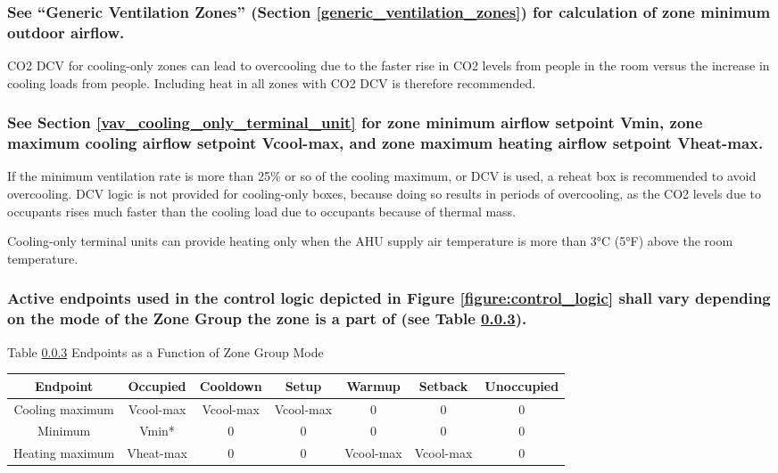 \documentclass[10pt]{article}
\begin{document}
\subsubsection{See “Generic Ventilation Zones” (Section \ref{generic_ventilation_zones}) for calculation of zone minimum outdoor airflow.}

CO2 DCV for cooling-only zones can lead to overcooling due to the faster rise in CO2 levels from people in the room versus the increase in cooling loads from people. Including heat in all zones with CO2 DCV is therefore recommended. 

\subsubsection{See Section \ref{vav_cooling_only_terminal_unit} for zone minimum airflow setpoint Vmin, zone maximum cooling airflow setpoint Vcool-max, and zone maximum heating airflow setpoint Vheat-max.}

If the minimum ventilation rate is more than 25\% or so of the cooling maximum, or DCV is used, a reheat box is recommended to avoid overcooling. DCV logic is not provided for cooling-only boxes, because doing so results in periods of overcooling, as the CO2 levels due to occupants rises much faster than the cooling load due to occupants because of thermal mass.

Cooling-only terminal units can provide heating only when the AHU supply air temperature is more than 3°C (5°F) above the room temperature.

\subsubsection{Active endpoints used in the control logic depicted in Figure \ref{figure:control_logic} shall vary depending on the mode of the Zone Group the zone is a part of (see Table \ref{figure:zone_group_mode}).}

\label{figure:zone_group_mode}
\begin{center}
Table \ref{figure:zone_group_mode} Endpoints as a Function of Zone Group Mode 
\end{center}
%
\begin{tabular}{ c|c|c|c|c|c|c } 
 \hline
 Endpoint & Occupied & Cooldown & Setup & Warmup & Setback & Unoccupied \\ 
 \hline
 Cooling maximum & Vcool-max & Vcool-max & Vcool-max & 0 & 0 & 0 \\ 
 \hline
 Minimum & Vmin* & 0 & 0 & 0 & 0 & 0 \\ 
 \hline
 Heating maximum & Vheat-max & 0 & 0 & Vcool-max & Vcool-max & 0 \\ 
 \hline
\end{tabular}
\end{document}
